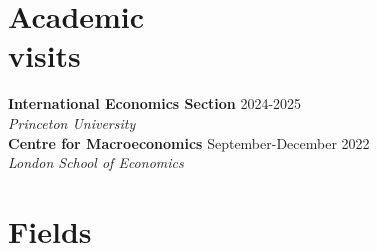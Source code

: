 \documentclass[margin]{res} %
\begin{document}
\begin{resume}
\section{Academic \\ visits}
{\bf International Economics Section} \hfill 2024-2025  \\
{\sl Princeton University} \\
{\bf Centre for Macroeconomics} \hfill September-December 2022  \\
{\sl London School of Economics}

%	
%	
%	
%	

\section{Fields}


\end{resume}
\end{document}
